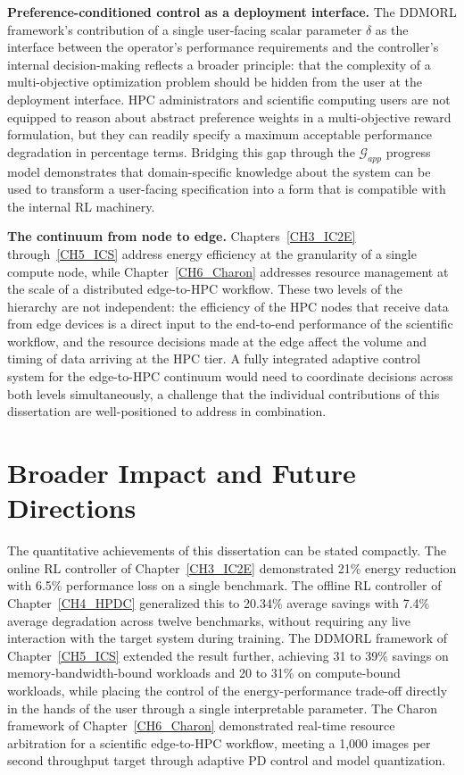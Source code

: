 \textbf{Preference-conditioned control as a deployment interface.}
The DDMORL framework's contribution of a single user-facing scalar parameter $\delta$
as the interface between the operator's performance requirements and the controller's
internal decision-making reflects a broader principle: that the complexity of a
multi-objective optimization problem should be hidden from the user at the deployment
interface.
HPC administrators and scientific computing users are not equipped to reason about
abstract preference weights in a multi-objective reward formulation, but they can
readily specify a maximum acceptable performance degradation in percentage terms.
Bridging this gap through the $\mathcal{G}_{app}$ progress model demonstrates that
domain-specific knowledge about the system can be used to transform a user-facing
specification into a form that is compatible with the internal RL machinery.

\textbf{The continuum from node to edge.}
Chapters~\ref{CH3_IC2E} through~\ref{CH5_ICS} address energy efficiency at the
granularity of a single compute node, while Chapter~\ref{CH6_Charon} addresses
resource management at the scale of a distributed edge-to-HPC workflow.
These two levels of the hierarchy are not independent: the efficiency of the HPC nodes
that receive data from edge devices is a direct input to the end-to-end performance of
the scientific workflow, and the resource decisions made at the edge affect the volume
and timing of data arriving at the HPC tier.
A fully integrated adaptive control system for the edge-to-HPC continuum would need to
coordinate decisions across both levels simultaneously, a challenge that the individual
contributions of this dissertation are well-positioned to address in combination.

\section{Broader Impact and Future Directions}

The quantitative achievements of this dissertation can be stated compactly.
The online RL controller of Chapter~\ref{CH3_IC2E} demonstrated 21\% energy reduction
with 6.5\% performance loss on a single benchmark.
The offline RL controller of Chapter~\ref{CH4_HPDC} generalized this to 20.34\%
average savings with 7.4\% average degradation across twelve benchmarks, without
requiring any live interaction with the target system during training.
The DDMORL framework of Chapter~\ref{CH5_ICS} extended the result further, achieving
31 to 39\% savings on memory-bandwidth-bound workloads and 20 to 31\% on compute-bound
workloads, while placing the control of the energy-performance trade-off directly in
the hands of the user through a single interpretable parameter.
The Charon framework of Chapter~\ref{CH6_Charon} demonstrated real-time resource
arbitration for a scientific edge-to-HPC workflow, meeting a 1,000 images per second
throughput target through adaptive PD control and model quantization.

